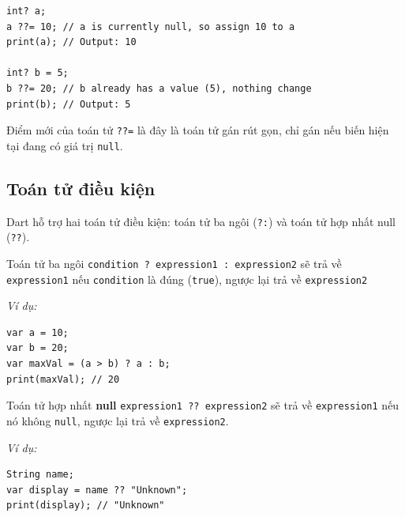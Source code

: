 \documentclass[../DoAn.tex]{subfiles}
\numberwithin{figure}{chapter}
\begin{document}
\begin{lstlisting}
int? a;
a ??= 10; // a is currently null, so assign 10 to a
print(a); // Output: 10

int? b = 5;
b ??= 20; // b already has a value (5), nothing change
print(b); // Output: 5
\end{lstlisting}

Điểm mới của toán tử \texttt{??=} là đây là toán tử gán rút gọn, chỉ gán nếu biến hiện tại đang có giá trị \texttt{null}.

\subsection{Toán tử điều kiện}
Dart hỗ trợ hai toán tử điều kiện: toán tử ba ngôi (\texttt{?:}) và toán tử hợp nhất null (\texttt{??}). 

Toán tử ba ngôi \texttt{condition ? expression1 : expression2} 
sẽ trả về \texttt{expression1} nếu \texttt{condition} là đúng (\texttt{true}), ngược lại trả về \texttt{expression2} 

\textit{Ví dụ:} 
\begin{lstlisting}
var a = 10; 
var b = 20; 
var maxVal = (a > b) ? a : b;
print(maxVal); // 20    
\end{lstlisting}

Toán tử hợp nhất \textbf{null} \texttt{expression1 ?? expression2} sẽ trả về \texttt{expression1} nếu nó không \texttt{null}, ngược lại trả về \texttt{expression2}. 

\textit{Ví dụ:}
\begin{lstlisting}
String name;
var display = name ?? "Unknown";
print(display); // "Unknown"
\end{lstlisting}
\end{document}
